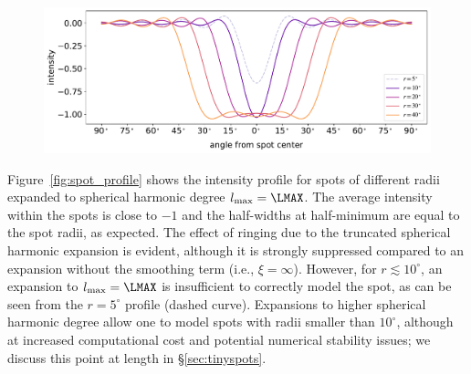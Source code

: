 \documentclass[modern,linenumbers]{aastex62}
\begin{document}
\begin{figure}[t!]
    \begin{centering}
        \includegraphics[width=\linewidth]{figures/spot_profile.pdf}
    \end{centering}
\end{figure}

Figure~\ref{fig:spot_profile} shows the intensity profile for spots of
different radii expanded to spherical harmonic degree $l_{\mathrm{max}} = \LMAX$.
The average intensity
within the spots is close to $-1$ and the half-widths at half-minimum are
equal to the spot radii, as expected.
The effect of ringing due to the truncated spherical harmonic expansion is
evident, although it is strongly suppressed compared to an expansion
without the smoothing term (i.e., $\xi = \infty$). However, for
$r \lesssim 10^\circ$, an expansion to $l_{\mathrm{max}} = \LMAX$ is
insufficient to correctly model the spot, as can be seen from the
$r = 5^\circ$ profile (dashed curve). Expansions to higher spherical harmonic
degree allow one to model spots with radii smaller than $10^\circ$, although
at increased computational cost and potential numerical stability issues;
we discuss this point at length in \S\ref{sec:tinyspots}.
\end{document}
